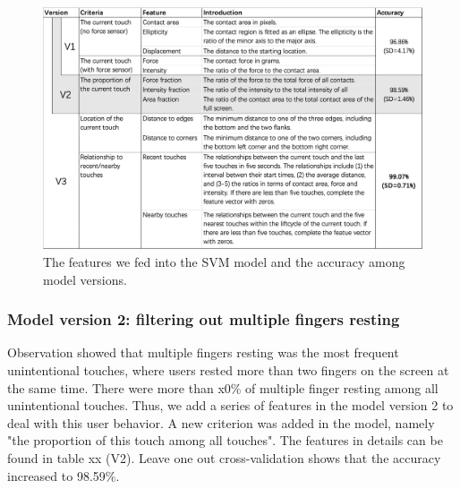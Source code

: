 
\begin{figure}[!tbh]
	\includegraphics[width=1.0\linewidth]{figures/features.png}
	\centering
	\caption{The features we fed into the SVM model and the accuracy among model versions.}
	\label{fig:feature1}
\end{figure}

\subsubsection{Model version 2: filtering out multiple fingers resting}

Observation showed that multiple fingers resting was the most frequent unintentional touches, where users rested more than two fingers on the screen at the same time. There were more than x0\% of multiple finger resting among all unintentional touches. Thus, we add a series of features in the model version 2 to deal with this user behavior. A new criterion was added in the model, namely "the proportion of this touch among all touches". The features in details can be found in table xx (V2). Leave one out cross-validation shows that the accuracy increased to 98.59\%.


